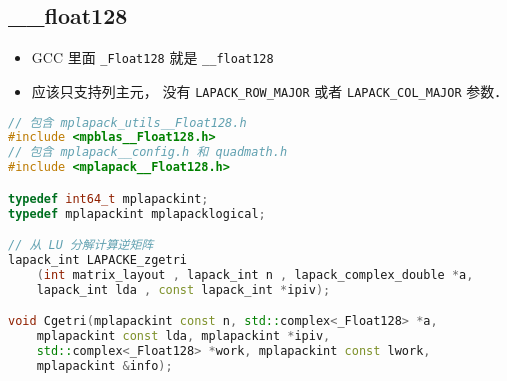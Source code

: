 
\begin{issues}
\issueDraft
\end{issues}


\subsection{__float128}
\begin{itemize}
\item GCC 里面 \verb|_Float128| 就是 \verb|__float128|
\item 应该只支持列主元， 没有 \verb|LAPACK_ROW_MAJOR| 或者 \verb|LAPACK_COL_MAJOR| 参数．
\end{itemize}

\begin{lstlisting}[language=cpp]
// 包含 mplapack_utils__Float128.h
#include <mpblas__Float128.h>
// 包含 mplapack__config.h 和 quadmath.h
#include <mplapack__Float128.h>

typedef int64_t mplapackint;
typedef mplapackint mplapacklogical;

// 从 LU 分解计算逆矩阵
lapack_int LAPACKE_zgetri
    (int matrix_layout , lapack_int n , lapack_complex_double *a,
    lapack_int lda , const lapack_int *ipiv);

void Cgetri(mplapackint const n, std::complex<_Float128> *a,
    mplapackint const lda, mplapackint *ipiv,
    std::complex<_Float128> *work, mplapackint const lwork,
    mplapackint &info);
\end{lstlisting}
